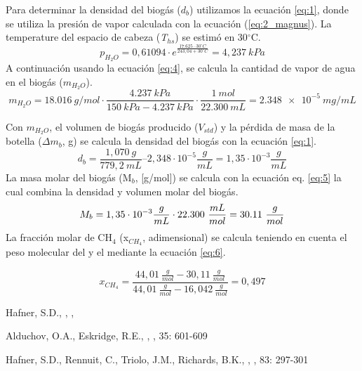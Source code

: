 \documentclass[spanish]{article}
\begin{document}
Para determinar la densidad del biogás ($d_b$) utilizamos la ecuación \ref{eq:1}, donde se utiliza la presión de vapor calculada con la ecuación (\ref{eq:2_magnus}). 
La temperature del espacio de cabeza (\textit{T}$_{hs}$) se estimó en 30$^\circ$C.
\begin{equation*}
   p_{H_2O} = 0,61094 \cdot e^{\frac{17.625 \cdot 30^\circ C}{243,04 + 30 ^\circ C}} = 4,237\ kPa
\end{equation*}
A continuación usando la ecuación \ref{eq:4}, se calcula la cantidad de vapor de agua en el biogás ($m_{H_2O}$).
\begin{equation*}
  m_{H_2O} = \SI{18,016} {g/mol} \cdot \frac{\SI{4.237}{kPa}}{\SI{150}{kPa} - \SI{4,237}{kPa}} \cdot \frac{\SI{1}{mol}}{\SI{22.300}{mL}} = \SI{2,348e-5}{mg/mL}
\end{equation*}

Con $m_{H_2O}$, el volumen de biogás producido ($V_{std}$) y la pérdida de masa de la botella ($\Delta m_b$, g) se calcula la densidad del biogás con la ecuación \ref{eq:1}.
\begin{equation*}
  d_b=\frac{1,070\ g}{779,2\ mL} – 2,348 \cdot 10^{-5} \frac{g}{mL} = 1,35 \cdot 10^{-3} \frac{g}{mL}
\end{equation*}
La masa molar del biogás (M$_b$, [g/mol]) se calcula con la ecuación eq. \ref{eq:5} la cual combina la densidad y volumen molar del biogás.
\begin{equation*}
  \centering
  M_b= 1,35 \cdot 10^{-3} \frac{g}{mL} \cdot 22.300\ \frac{mL}{mol} = 30.11\ \frac{g}{mol}
\end{equation*}
La fracción molar de CH$_4$ (x$_{CH_4}$, adimensional) se calcula teniendo en cuenta el peso molecular del  y el  mediante la ecuación \ref{eq:6}. 

\begin{equation*}
  x_{CH_4}=\frac{44,01\ \frac{g}{mol}-30,11\ \frac{g}{mol}}{44,01\ \frac{g}{mol}-16,042\ \frac{g}{mol}} = 0,497
\end{equation*}


\begin{thebibliography}{1}

Hafner, S.D.,
    ,
    ,

Alduchov, O.A., Eskridge, R.E.,   
    ,
    , 
     35: 601-609

Hafner, S.D., Rennuit, C., Triolo, J.M., Richards, B.K.,
    ,
    ,
         83: 297-301

\end{thebibliography}
\end{document}
